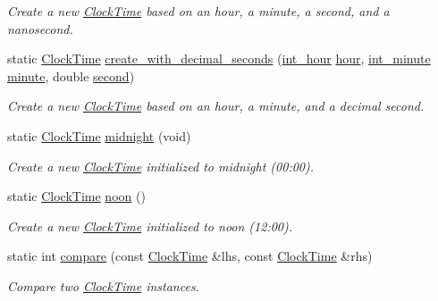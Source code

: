 \begin{DoxyCompactItemize}
\begin{DoxyCompactList}\small\item\em Create a new \hyperlink{structClockTime}{Clock\-Time} based on an hour, a minute, a second, and a nanosecond. \end{DoxyCompactList}\item 
static \hyperlink{structClockTime}{Clock\-Time} \hyperlink{structClockTime_a71e4e398da2cb0cfd3adb3f87cb6f3c2}{create\-\_\-with\-\_\-decimal\-\_\-seconds} (\hyperlink{types_8h_abc83767329d565949a30f9990b5b2323}{int\-\_\-hour} \hyperlink{structClockTime_a46aca2fc3ed57f80398729383d7b81d3}{hour}, \hyperlink{types_8h_ac1c9417e7360815b48bbc1efa2b8240c}{int\-\_\-minute} \hyperlink{structClockTime_a812681b81ece92f27756f0618e56f37b}{minute}, double \hyperlink{structClockTime_a568f139cb2e19fca3e2ae2acdf47787f}{second})
\begin{DoxyCompactList}\small\item\em Create a new \hyperlink{structClockTime}{Clock\-Time} based on an hour, a minute, and a decimal second. \end{DoxyCompactList}\item 
static \hyperlink{structClockTime}{Clock\-Time} \hyperlink{structClockTime_a86812abf316c02aac86f9d8b0a0e0f28}{midnight} (void)
\begin{DoxyCompactList}\small\item\em Create a new \hyperlink{structClockTime}{Clock\-Time} initialized to midnight (00\-:00). \end{DoxyCompactList}\item 
static \hyperlink{structClockTime}{Clock\-Time} \hyperlink{structClockTime_ae206b86808ff1d0158cbc920eb289797}{noon} ()
\begin{DoxyCompactList}\small\item\em Create a new \hyperlink{structClockTime}{Clock\-Time} initialized to noon (12\-:00). \end{DoxyCompactList}\item 
static int \hyperlink{structClockTime_a4c185648dcfc28f46ac3fc700b3415c2}{compare} (const \hyperlink{structClockTime}{Clock\-Time} \&lhs, const \hyperlink{structClockTime}{Clock\-Time} \&rhs)
\begin{DoxyCompactList}\small\item\em Compare two \hyperlink{structClockTime}{Clock\-Time} instances. \end{DoxyCompactList}\end{DoxyCompactItemize}
